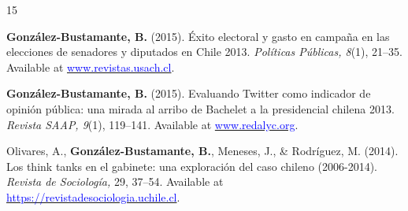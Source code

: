 \begin{publications}
\begin{benumerate}{15}

\item{{\bfseries González-Bustamante, B.} (2015). Éxito electoral y gasto en campaña en las elecciones de senadores y diputados en Chile 2013. {\itshape Políticas Públicas, 8}(1), 21--35. Available at \href{http://www.revistas.usach.cl/ojs/index.php/politicas/article/view/2182}{\textcolor{blue}{www.revistas.usach.cl}}.} \vspace{1mm}


\item{{\bfseries González-Bustamante, B.} (2015). Evaluando Twitter como indicador de opinión pública: una mirada al arribo de Bachelet a la presidencial chilena 2013. {\itshape Revista SAAP, 9}(1), 119--141. Available at \href{https://www.redalyc.org/articulo.oa?id=387142733006}{\textcolor{blue}{www.redalyc.org}}.} \vspace{1mm}


\item{Olivares, A., {\bfseries González-Bustamante, B.}, Meneses, J., \& Rodríguez, M. (2014). Los think tanks en el gabinete: una exploración del caso chileno (2006-2014). {\itshape Revista de Sociología,} 29, 37--54. Available at \\ \href{https://revistadesociologia.uchile.cl/index.php/RDS/article/view/36177}{\textcolor{blue}{https://revistadesociologia.uchile.cl}}.} \vspace{1mm} %


\end{benumerate}
\end{publications}
